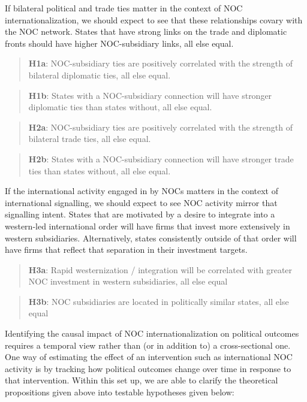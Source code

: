 \documentclass[11pt,]{book}
\begin{document}
If bilateral political and trade ties matter in the context of NOC internationalization, we should expect to see that these relationships covary with the NOC network. States that have strong links on the trade and diplomatic fronts should have higher NOC-subsidiary links, all else equal.

\begin{quote}
\textbf{H1a}: NOC-subsidiary ties are positively correlated with the strength of bilateral diplomatic ties, all else equal.
\end{quote}

\begin{quote}
\textbf{H1b}: States with a NOC-subsidiary connection will have stronger diplomatic ties than states without, all else equal.
\end{quote}

\begin{quote}
\textbf{H2a}: NOC-subsidiary ties are positively correlated with the strength of bilateral trade ties, all else equal.
\end{quote}

\begin{quote}
\textbf{H2b}: States with a NOC-subsidiary connection will have stronger trade ties than states without, all else equal.
\end{quote}

If the international activity engaged in by NOCs matters in the context of international signalling, we should expect to see NOC activity mirror that signalling intent. States that are motivated by a desire to integrate into a western-led international order will have firms that invest more extensively in western subsidiaries. Alternatively, states consistently outside of that order will have firms that reflect that separation in their investment targets.

\begin{quote}
\textbf{H3a}: Rapid westernization / integration will be correlated with greater NOC investment in western subsidiaries, all else equal
\end{quote}

\begin{quote}
\textbf{H3b}: NOC subsidiaries are located in politically similar states, all else equal
\end{quote}

Identifying the causal impact of NOC internationalization on political outcomes requires a temporal view rather than (or in addition to) a cross-sectional one. One way of estimating the effect of an intervention such as international NOC activity is by tracking how political outcomes change over time in response to that intervention. Within this set up, we are able to clarify the theoretical propositions given above into testable hypotheses given below:
\end{document}
